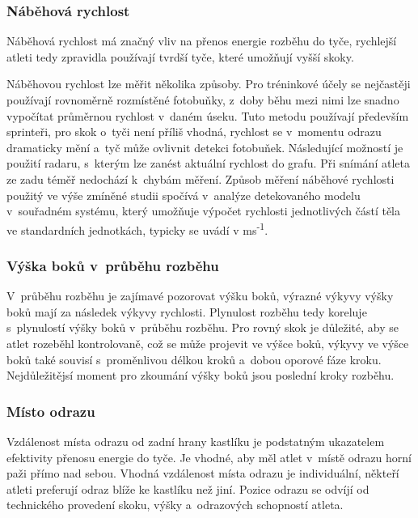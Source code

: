 \subsubsection{Náběhová rychlost}

Náběhová rychlost má značný vliv na přenos energie rozběhu do tyče, rychlejší atleti tedy zpravidla používají tvrdší tyče, které umožňují vyšší skoky.

Náběhovou rychlost lze měřit několika způsoby. Pro tréninkové účely se nejčastěji používají rovnoměrně rozmístěné fotobuňky, z~doby běhu mezi nimi lze snadno vypočítat průměrnou rychlost v~daném úseku. Tuto metodu používají především sprinteři, pro skok o~tyči není příliš vhodná, rychlost se v~momentu odrazu dramaticky mění a~tyč může ovlivnit detekci fotobuňek. Následující možností je použití radaru, s~kterým lze zanést aktuální rychlost do grafu. Při snímání atleta ze zadu téměř nedochází k~chybám měření. Způsob měření náběhové rychlosti použitý ve výše zmíněné studii spočívá v~analýze detekovaného modelu v~souřadném systému, který umožňuje výpočet rychlosti jednotlivých částí těla ve standardních jednotkách, typicky se uvádí v ms\textsuperscript{-1}.

\subsubsection{Výška boků v~průběhu rozběhu}

V~průběhu rozběhu je zajímavé pozorovat výšku boků, výrazné výkyvy výšky boků mají za následek výkyvy rychlosti. Plynulost rozběhu tedy koreluje s~plynulostí výšky boků v~průběhu rozběhu. Pro rovný skok je důležité, aby se atlet rozeběhl kontrolovaně, což se může projevit ve výšce boků, výkyvy ve výšce boků také souvisí s~proměnlivou délkou kroků a~dobou oporové fáze kroku. Nejdůležitějsí moment pro zkoumání výšky boků jsou poslední kroky rozběhu.

\subsubsection{Místo odrazu}

Vzdálenost místa odrazu od zadní hrany kastlíku je podstatným ukazatelem efektivity přenosu energie do tyče. Je vhodné, aby měl atlet v~místě odrazu horní paži přímo nad sebou. Vhodná vzdálenost místa odrazu je individuální, někteří atleti preferují odraz blíže ke kastlíku než jiní. Pozice odrazu se odvíjí od technického provedení skoku, výšky a~odrazových schopností atleta.

